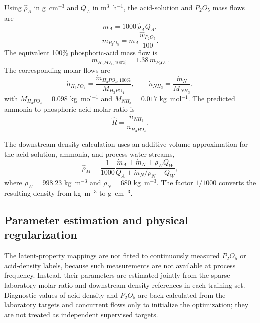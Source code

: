 \documentclass[preprint,12pt,authoryear]{elsarticle}
\begin{document}
Using $\widehat{\rho}_{A}$ in g~cm$^{-3}$ and $Q_A$ in m$^3$~h$^{-1}$, the acid-solution and $P_2O_5$ mass flows are
\begin{equation}
\dot m_A=1000\,\widehat{\rho}_A Q_A,
\end{equation}
\begin{equation}
\dot m_{P_2O_5}=\dot m_A\frac{\widehat{w}_{P_2O_5}}{100}.
\end{equation}
The equivalent 100\% phosphoric-acid mass flow is
\begin{equation}
\dot m_{H_3PO_4,100\%}=1.38\,\dot m_{P_2O_5}.
\end{equation}
The corresponding molar flows are
\begin{equation}
\dot n_{H_3PO_4}=
\frac{\dot m_{H_3PO_4,100\%}}{M_{H_3PO_4}},
\qquad
\dot n_{NH_3}=
\frac{\dot m_N}{M_{NH_3}},
\end{equation}
with $M_{H_3PO_4}=0.098$ kg~mol$^{-1}$ and $M_{NH_3}=0.017$ kg~mol$^{-1}$. The predicted ammonia-to-phosphoric-acid molar ratio is
\begin{equation}
\widehat R=
\frac{\dot n_{NH_3}}{\dot n_{H_3PO_4}}.
\end{equation}

The downstream-density calculation uses an additive-volume approximation for the acid solution, ammonia, and process-water streams,
\begin{equation}
\widehat{\rho}_M=
\frac{1}{1000}
\frac{
\dot m_A+\dot m_N+\rho_W Q_W
}{
Q_A+\dot m_N/\rho_N+Q_W
},
\end{equation}
where $\rho_W=998.23$ kg~m$^{-3}$ and $\rho_N=680$ kg~m$^{-3}$. The factor $1/1000$ converts the resulting density from kg~m$^{-3}$ to g~cm$^{-3}$.

\subsection{Parameter estimation and physical regularization}

The latent-property mappings are not fitted to continuously measured $P_2O_5$ or acid-density labels, because such measurements are not available at process frequency. Instead, their parameters are estimated jointly from the sparse laboratory molar-ratio and downstream-density references in each training set. Diagnostic values of acid density and $P_2O_5$ are back-calculated from the laboratory targets and concurrent flows only to initialize the optimization; they are not treated as independent supervised targets.
\end{document}
